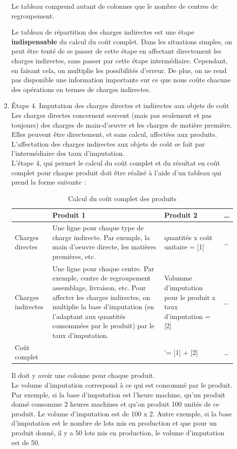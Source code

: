 \documentclass{tufte-handout}
\begin{document}
\begin{enumerate}
\begin{enumerate}
Le tableau comprend autant de colonnes que le nombre de centres de regroupement.\\

\begin{warning}
Le tableau de répartition des charges indirectes est une étape \textbf{indispensable} du calcul du coût complet. Dans les situations simples, on peut être tenté de se passer de cette étape en affectant directement les charges indirectes, sans passer par cette étape intermédiaire. Cependant, en faisant cela, on multiplie les possibilités d'erreur. De plus, on ne rend pas disponible une information importante sur ce que nous coûte chacune des opérations en termes de charges indirectes.\\
\end{warning}

\item Étape 4. Imputation des charges directes et indirectes aux objets de coût
\label{sec:org212669a}
Les charges directes concernent souvent (mais pas seulement et pas toujours) des charges de main-d'œuvre et les charges de matière première. Elles peuvent être directement, et sans calcul, affectées aux produits.\\
L'affectation des charges indirectes aux objets de coût se fait par l'intermédiaire des taux d'imputation.\\
L'étape 4, qui permet le calcul du coût complet et du résultat en coût complet pour chaque produit doit être réalisé à l'aide d'un tableau qui prend la forme suivante :\\
\begin{table}[htbp]
\caption{Calcul du coût complet des produits}
\centering
\begin{tabular}{llll}
 & Produit 1 & Produit 2 & \ldots{}\\
\hline
Charges directes & Une ligne pour chaque type de charge indirecte. Par exemple, la main d'oeuvre directe, les matières premières, etc. & quantités x coût unitaire = [1] & \ldots{}\\
Charges indirectes & Une ligne pour chaque centre. Par exemple, centre de regroupement assemblage, livraison, etc. Pour affecter les charges indirectes, on multiplie la base d'imputation (en l'adaptant aux quantités consommées par le produit) par le taux d'imputation. & Volumme d'imputation pour le produit x taux d'imputation = [2] & \ldots{}\\
Coût complet &  & '= [1] + [2] & \ldots{}\\
\end{tabular}
\end{table}
Il doit y avoir une colonne pour chaque produit.\\
Le volume d'imputation correspond à ce qui est consommé par le produit. Par exemple, si la base d'imputation est l'heure machine, qu'un produit donné consomme 2 heures machines et qu'on produit 100 unités de ce produit. Le volume d'imputation est de 100 x 2. Autre exemple, si la base d'imputation est le nombre de lots mis en production et que pour un produit donné, il y a 50 lots mis en production, le volume d'imputation est de 50.\\


\end{enumerate}
\end{enumerate}
\end{document}

